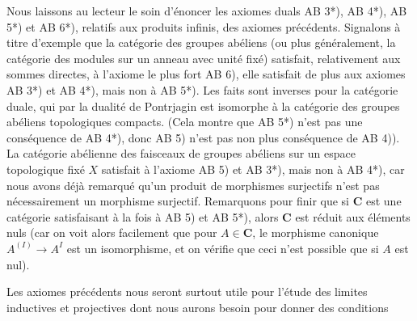 Nous laissons au lecteur le soin d'énoncer les axiomes duals AB 3*), AB 4*),
AB 5*) et AB 6*), relatifs aux produits infinis, des axiomes précédents.
Signalons à titre d'exemple que la catégorie des groupes abéliens (ou plus
généralement, la catégorie des modules sur un anneau avec unité fixé)
satisfait, relativement aux sommes directes, à l'axiome le plus fort AB 6),
elle satisfait de plus aux axiomes AB 3*) et AB 4*), mais non à AB 5*). Les
faits sont inverses pour la catégorie duale, qui par la dualité de Pontrjagin
est isomorphe à la catégorie des groupes abéliens topologiques compacts. (Cela
montre que AB 5*) n'est pas une conséquence de AB 4*), donc AB 5) n'est pas non
plus conséquence de AB 4)). La catégorie abélienne des faisceaux de groupes
abéliens sur un espace topologique fixé $X$ satisfait à l'axiome AB 5) et
AB 3*), mais non à AB 4*), car nous avons déjà remarqué qu'un produit de
morphismes surjectifs n'est pas nécessairement un morphisme surjectif.
Remarquons pour finir que si $\mathbf{C}$ est une catégorie satisfaisant à la fois à
AB 5) et AB 5*), alors $\mathbf{C}$ est réduit aux éléments nuls (car on voit alors
facilement que pour $A\in\mathbf{C}$, le morphisme canonique
$A^{(I)}\to A^I$ est un isomorphisme, et on vérifie que ceci n'est
possible que si $A$ est nul).

Les axiomes précédents nous seront surtout utile pour l'étude des limites
inductives et projectives dont nous aurons besoin pour donner des conditions

